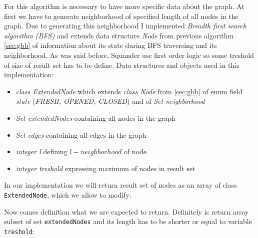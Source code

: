 \documentclass[11pt,twoside,a4paper]{book}
\begin{document}
\begin{center}
\end{center}

For this algorithm is necessary to have more specific data about the graph. At
first we have to generate neighborhood of specified length of all nodes in the
graph. Due to generating this neighborhood I implemented \textit{Breadth
first search algorithm (BFS)} and extends data structure \textit{Node} from
previous algorithm \ref{sec:gbb} of information about its state during BFS
traversing and its neighborhood. As was said before, Squander use first
order logic so some treshold of size of result set has to be define. Data
structures and objects used in this implementation:

\begin{itemize}
  \item \textit{class ExtendedNode} which extends \textit{class Node} from
  \ref{sec:gbb} of enum field \textit{state} (\textit{FRESH, OPENED, CLOSED})
  and of \textit{Set neighborhood}
  \item \textit{Set extendedNodes} containing all nodes in the graph
\item \textit{Set edges} containing all edges in the graph
  \item \textit{integer l} defining $l-neighborhood$ of node
  \item \textit{integer treshold} expressing maximum of nodes in result set
\end{itemize}

In our implementation we will return result set of nodes as an array of
class \verb|ExtendedNode|, which we allow to modify:



Now comes definition what we are expected to return. Definitely is return array
subset of set \verb|extendedNodes| and its length has to be shorter or equal to
variable \verb|treshold|:
\end{document}
